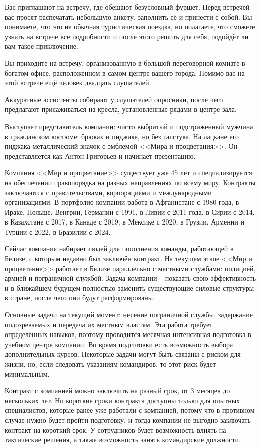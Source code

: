 \documentclass{article}
\begin{document}
Вас приглашают на встречу, где обещают безусловный фуршет. Перед
встречей вас просят распечатать небольшую анкету, заполнить её и
принести с собой. Вы понимаете, что это не обычная туристическая
поездка, но полагаете, что сможете узнать на встрече все подробности и
после этого решить для себя, подойдёт ли вам такое приключение.

Вы приходите на встречу, организованную в большой переговорной комнате в
богатом офисе, расположенном в самом центре вашего города. Помимо вас на
этой встрече ещё человек двадцать слушателей.

Аккуратные ассистенты собирают у слушателей опросники, после чего
предлагают присаживаться на кресла, установленные рядами в центре зала.

Выступает представитель компании: чисто выбритый и подстриженный мужчина
в гражданском костюме: брюках и пиджаке, но без галстука. На лацкане его
пиджака металлический значок с эмблемой <<Мира и процветания>>. Он
представляется как Антон Григорьев и начинает презентацию.

Компания <<Мир и процветание>> существует уже 45 лет и специализируется на
обеспечении правопорядка на разных направлениях по всему миру. Контракты
заключаются с правительствами, корпорациями и международными
организациями. В портфолио компании работа в Афганистане с 1980 года, в
Ираке, Польше, Венгрии, Германии с 1991, в Ливии с 2011 года, в Сирии с
2014, в Казахстане с 2017, в Канаде с 2019, в Мексике с 2020, в Грузии,
Армении и Турции с 2022, в Бразилии с 2024.

Сейчас компания набирает людей для пополнения команды, работающей в
Белизе, с которым недавно был заключён контракт. На текущем этапе <<Мир и
процветание>> работает в Белизе параллельно с местными службами:
полицией, армией и пограничной службой. Задача компании -- показать свою
эффективность и в ближайшем будущем полностью заменить существующие
силовые структуры в стране, после чего они будут расформированы.

Основные задачи на текущий момент: несение пограничной службы,
задержание подозреваемых и передача их местным властям. Эта работа
требует определённых навыков, поэтому проводится месячная интенсивная
подготовка в учебном центре компании. Во время подготовки есть
возможность выбора дополнительных курсов. Некоторые задачи могут быть
связаны с риском для жизни, но, если следовать указаниям командиров, то
этот риск будет минимальным.

Контракт с компанией можно заключить на разный срок, от 3 месяцев до
нескольких лет. Но короткие сроки контракта доступны только для опытных
специалистов, которые ранее уже работали с компанией, потому что в
противном случае нужно будет пройти подготовку, и тогда компании не
выгодно заключать контракт на короткий срок. У сотрудников будет
возможность влиять на тактические решения, а также возможность занять
командирские должности.
\end{document}
